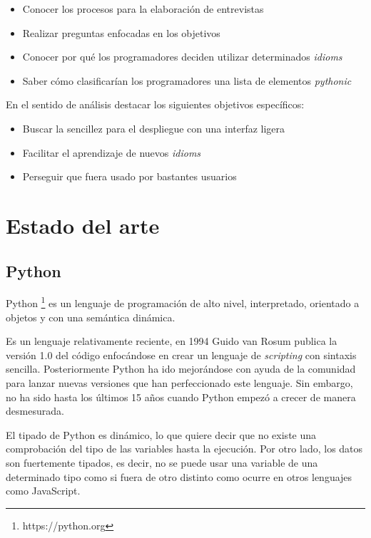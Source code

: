 \documentclass[a4paper, 12pt]{book}
\begin{document}
\begin{itemize}
    \item Conocer los procesos para la elaboración de entrevistas
    \item Realizar preguntas enfocadas en los objetivos
    \item Conocer por qué los programadores deciden utilizar determinados \textit{idioms}
    \item Saber cómo clasificarían los programadores una lista de elementos \textit{pythonic}
\end{itemize}

En el sentido de análisis destacar los siguientes objetivos específicos:
\begin{itemize}
    \item Buscar la sencillez para el despliegue con una interfaz ligera
    \item Facilitar el aprendizaje de nuevos \textit{idioms}
    \item Perseguir que fuera usado por bastantes usuarios
\end{itemize}

   

\cleardoublepage
\chapter{Estado del arte}
\label{chap:arte}
\section{Python}

Python \footnote{https://python.org} es un lenguaje de programación de alto nivel, interpretado, orientado a objetos y con una semántica dinámica.

Es un lenguaje relativamente reciente, en 1994 Guido van Rosum publica la versión 1.0 del código enfocándose en crear un lenguaje de \textit{scripting} con sintaxis sencilla. Posteriormente Python ha ido mejorándose con ayuda de la comunidad para lanzar nuevas versiones que han perfeccionado este lenguaje. Sin embargo, no ha sido hasta los últimos 15 años cuando Python empezó a crecer de manera desmesurada.

El tipado de Python es dinámico, lo que quiere decir que no existe una comprobación del tipo de las variables hasta la ejecución. Por otro lado, los datos son fuertemente tipados, es decir, no se puede usar una variable de una determinado tipo como si fuera de otro distinto como ocurre en otros lenguajes como JavaScript.
\end{document}

